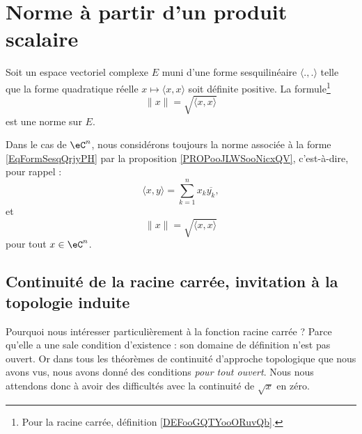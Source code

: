 \section{Norme à partir d'un produit scalaire}

\begin{proposition}            \label{PROPooJLWSooNicxQV}
	Soit un espace vectoriel complexe \( E\) muni d'une forme sesquilinéaire \( \langle ., .\rangle \) telle que la forme quadratique réelle \( x\mapsto\langle x, x \rangle\) soit définite positive. La formule\footnote{Pour la racine carrée, définition \ref{DEFooGQTYooORuvQb}.}
	\begin{equation}        \label{EQooZIXRooMGcsXY}
		\| x \|=  \sqrt{ \langle x, x\rangle }
	\end{equation}
	est une norme sur \( E\).
\end{proposition}

\begin{definition}      \label{DEFooGUXNooXwCsrq}
	Dans le cas de \( \eC^n\), nous considérons toujours la norme associée à la forme \eqref{EqFormSesqQrjyPH} par la proposition \ref{PROPooJLWSooNicxQV}, c'est-à-dire, pour rappel :
	\begin{equation}
		\langle x, y\rangle =\sum_{k=1}^nx_k\overline {y_k},
	\end{equation}
	et
	\begin{equation}
		\| x \|=  \sqrt{ \langle x, x\rangle }
	\end{equation}
	pour tout \( x\in \eC^n\).
\end{definition}

\subsection{Continuité de la racine carrée, invitation à la topologie induite}

Pourquoi nous intéresser particulièrement à la fonction racine carrée ? Parce qu'elle a une sale condition d'existence : son domaine de définition n'est pas ouvert. Or dans tous les théorèmes de continuité d'approche topologique que nous avons vus, nous avons donné des conditions \emph{pour tout ouvert}. Nous nous attendons donc à avoir des difficultés avec la continuité de \( \sqrt{x}\) en zéro.


